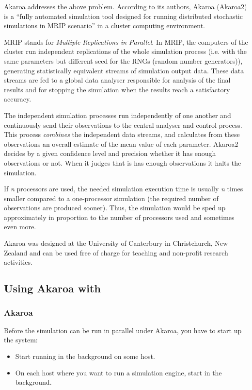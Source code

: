 Akaroa \cite{Akaroa99} addresses the above problem.
According to its authors, Akaroa (Akaroa2) is a ``fully automated
simulation tool designed for running distributed stochastic simulations
in MRIP scenario'' in a cluster computing environment.

MRIP stands for \textit{Multiple Replications in Parallel}.
In MRIP, the computers of the cluster run independent replications
of the whole simulation process (i.e. with the same parameters but
different seed for the RNGs (random number generators)),
generating statistically equivalent streams of simulation output data.
These data streams are fed to a global data analyser responsible for
analysis of the final results and for stopping the simulation
when the results reach a satisfactory accuracy.

The independent simulation processes run independently of one another
and continuously send their observations to the central analyser
and control process. This process \textit{combines} the independent data streams,
and calculates from these observations an overall estimate of the mean value
of each parameter.
Akaroa2 decides by a given confidence level and precision
whether it has enough observations or not. When it judges that is
has enough observations it halts the simulation.

If \textit{n} processors are used, the needed simulation execution time
is usually \textit{n} times smaller compared to a one-processor
simulation (the required number of observations are produced sooner).
Thus, the simulation would be sped up approximately in proportion
to the number of processors used and sometimes even more.

Akaroa was designed at the University of Canterbury in Christchurch, New Zealand
and can be used free of charge for teaching and non-profit research activities.


\subsection{Using Akaroa with {\opp}}
\label{sec:run-sim:using-akaroa}

\subsubsection{Akaroa}
\label{sec:run-sim:starting-up-akaroa}

Before the simulation can be run in parallel under Akaroa, you have to
start up the system:

\begin{itemize}
  \item{Start  running in the background on some host.}
  \item{On each host where you want to run a simulation engine,
     start  in the background.}
\end{itemize}


